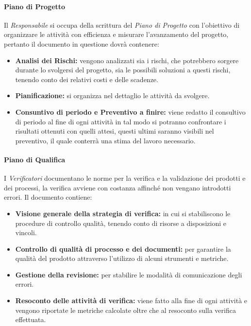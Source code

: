 \paragraph{Piano di Progetto}
Il \textit{Responsabile} si occupa della scrittura del \textit{Piano di Progetto} con l'obiettivo di organizzare le attività con efficienza e misurare l'avanzamento del progetto, pertanto il documento in questione dovrà contenere:
\begin{itemize}
	\item \textbf{Analisi dei Rischi:} vengono analizzati sia i rischi, che potrebbero sorgere durante lo svolgersi del progetto, sia le possibili soluzioni a questi rischi, tenendo conto dei relativi costi e delle scadenze.
	\item \textbf{Pianificazione:} si organizza nel dettaglio le attività da svolgere.
	\item \textbf{Consuntivo di periodo e Preventivo a finire:} viene redatto il consultivo di periodo al fine di ogni attività in tal modo si potranno confrontare i risultati ottenuti con quelli attesi, questi ultimi saranno visibili nel preventivo, il quale conterrà una stima del lavoro necessario.
\end{itemize}

\paragraph{Piano di Qualifica}
I \textit{Verificatori} documentano le norme per la verifica e la validazione dei prodotti e dei processi, la verifica avviene con costanza affinché non vengano introdotti errori. Il documento contiene:
\begin{itemize}
	\item \textbf{Visione generale della strategia di verifica:} in cui si stabiliscono le procedure di controllo qualità, tenendo conto di risorse a disposizioni e vincoli.
	\item \textbf{Controllo di qualità di processo e dei documenti:} per garantire la qualità del prodotto attraverso l'utilizzo di alcuni strumenti e metriche.
	\item \textbf{Gestione della revisione:} per stabilire le modalità di comunicazione degli errori.
	\item \textbf{Resoconto delle attività di verifica:} viene fatto alla fine di ogni attività e vengono riportate le metriche calcolate oltre che al resoconto sulla verifica effettuata.
\end{itemize}

